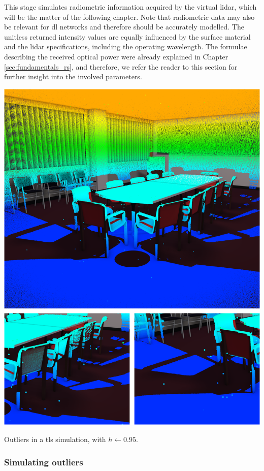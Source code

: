 This stage simulates radiometric information acquired by the virtual \acrshort{lidar}, which will be the matter of the following chapter. Note that radiometric data may also be relevant for \acrshort{dl} networks and therefore should be accurately modelled. The unitless returned intensity values are equally influenced by the surface material and the \acrshort{lidar} specifications, including the operating wavelength. The formulae describing the received optical power were already explained in Chapter \ref{sec:fundamentals_rs}, and therefore, we refer the reader to this section for further insight into the involved parameters. 

\begin{marginfigure}[.3cm]
	\centering
	\includegraphics[width=\linewidth]{figs/lidar_simulation/outliers.png}
	\caption{Outliers in a \acrshort{tls} simulation, with $h \gets 0.95$.}
	\label{fig:lidar_outliers}
\end{marginfigure}

\subsubsection{Simulating outliers}


